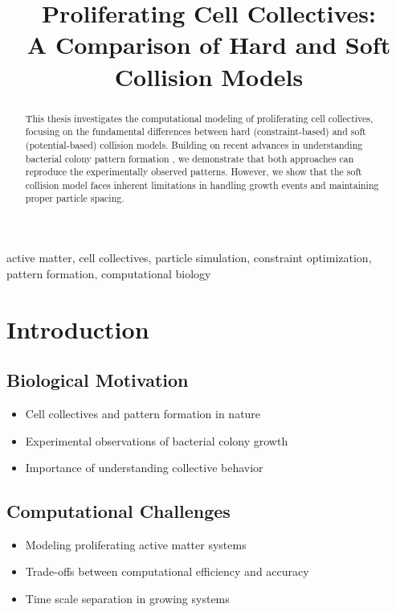 \documentclass[conference]{IEEEtran}
\begin{document}
\title{Proliferating Cell Collectives: \\A Comparison of Hard and Soft Collision Models}

\author{
}

\maketitle

\begin{abstract}
    This thesis investigates the computational modeling of proliferating cell collectives, focusing on the fundamental differences between hard (constraint-based) and soft (potential-based) collision models. Building on recent advances in understanding bacterial colony pattern formation \cite{Weady2024}, we demonstrate that both approaches can reproduce the experimentally observed patterns. However, we show that the soft collision model faces inherent limitations in handling growth events and maintaining proper particle spacing.

\end{abstract}

\begin{IEEEkeywords}
    active matter, cell collectives, particle simulation, constraint optimization, pattern formation, computational biology
\end{IEEEkeywords}

\section{Introduction}
\subsection{Biological Motivation}
\begin{itemize}
    \item Cell collectives and pattern formation in nature
    \item Experimental observations of bacterial colony growth
    \item Importance of understanding collective behavior
\end{itemize}

\subsection{Computational Challenges}
\begin{itemize}
    \item Modeling proliferating active matter systems
    \item Trade-offs between computational efficiency and accuracy
    \item Time scale separation in growing systems
\end{itemize}
\end{document}
